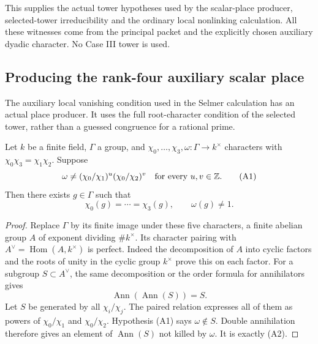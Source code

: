 This supplies the actual tower hypotheses used by
the scalar-place producer, selected-tower irreducibility
and the ordinary local nonlinking calculation.
All these witnesses come from the principal packet and
the explicitly chosen auxiliary dyadic character.
No Case III tower is used.



\subsection{Producing the rank-four auxiliary scalar place}
\label{subsec:sr-four-scalar-place}
The auxiliary local vanishing condition used in the Selmer
calculation has an actual place producer.
It uses the full root-character condition of the selected
tower, rather than a guessed congruence for a rational prime.

\begin{srlemma}\label{lem:sr-finite-character-separation}
Let \(k\) be a finite field, \(\Gamma\) a group, and
\(\chi_0,\ldots,\chi_3,\omega:\Gamma\to k^\times\)
characters with
\(\chi_0\chi_3=\chi_1\chi_2\).
Suppose
\[
       \omega\ne(\chi_0/\chi_1)^u(\chi_0/\chi_2)^v
                            \quad\hbox{for every }u,v\in\mathbb Z .
 \tag{A1}
\]
Then there exists \(g\in\Gamma\) such that
\[
                     \chi_0(g)=\cdots=\chi_3(g),
                            \qquad\omega(g)\ne1.
 \tag{A2}
\]
\end{srlemma}
\begin{proof}
Replace \(\Gamma\) by its finite image under these five
characters, a finite abelian group \(A\) of exponent
dividing \(\#k^\times\).
Its character pairing with
\(A^\vee=\operatorname{Hom}(A,k^\times)\) is perfect.
Indeed the decomposition of \(A\) into cyclic factors
and the roots of unity in the cyclic group \(k^\times\)
prove this on each factor.
For a subgroup \(S\subset A^\vee\), the same decomposition
or the order formula for annihilators gives
\[
                       \operatorname{Ann}
                         (\operatorname{Ann}(S))=S.
\]
Let \(S\) be generated by all \(\chi_i/\chi_j\).
The paired relation expresses all of them as powers of
\(\chi_0/\chi_1\) and \(\chi_0/\chi_2\).
Hypothesis (A1) says \(\omega\notin S\).
Double annihilation therefore gives an element of
\(\operatorname{Ann}(S)\) not killed by \(\omega\).
It is exactly (A2).
\end{proof}

